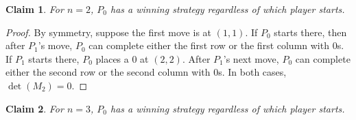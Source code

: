 \documentclass[11pt]{article}
\newtheorem{claim}{Claim}
\begin{document}
\medskip
\begin{claim}
For $n=2$, $P_0$ has a winning strategy regardless of which player starts.
\end{claim}

\begin{proof}
By symmetry, suppose the first move is at $(1,1)$. If $P_0$ starts there, then after $P_1$'s move, $P_0$ can complete either the first row or the first column with $0$s. If $P_1$ starts there, $P_0$ places a $0$ at $(2,2)$. After $P_1$'s next move, $P_0$ can complete either the second row or the second column with $0$s. In both cases, $\det(M_2)=0$.
\end{proof}

\medskip
\begin{claim}
For $n=3$, $P_0$ has a winning strategy regardless of which player starts.
\end{claim}
\end{document}
